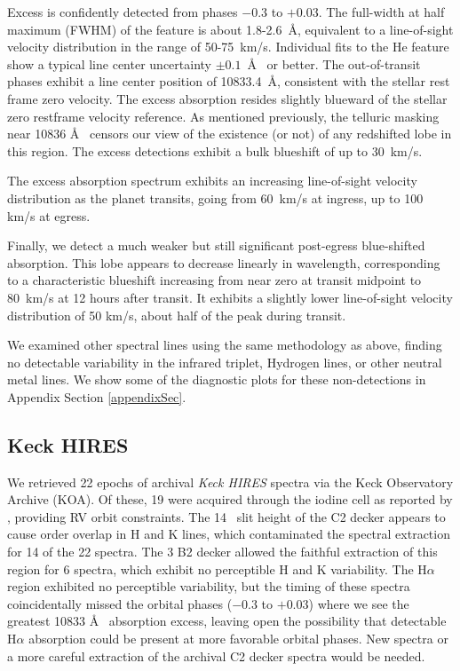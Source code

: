 \documentclass[twocolumn]{aastex631}
\begin{document}
Excess is confidently detected from phases $-$0.3 to $+$0.03.  The full-width at half maximum (FWHM) of the feature is about 1.8-2.6~\AA, equivalent to a line-of-sight velocity distribution in the range of 50-75~km/s.  Individual fits to the He feature show a typical line center uncertainty $\pm0.1$~\AA~ or better.  The out-of-transit phases exhibit a line center position of 10833.4~\AA, consistent with the stellar  rest frame zero velocity.  The excess absorption resides slightly blueward of the stellar zero restframe velocity reference.  As mentioned previously, the telluric masking near 10836 \AA~ censors our view of the existence (or not) of any redshifted lobe in this region.  The excess detections exhibit a bulk blueshift of up to 30~km/s.

The excess absorption spectrum exhibits an increasing line-of-sight velocity distribution as the planet transits, going from 60~km/s at ingress, up to 100 km/s at egress.

Finally, we detect a much weaker but still significant post-egress blue-shifted absorption.  This lobe appears to decrease linearly in wavelength, corresponding to a characteristic blueshift increasing from near zero at transit midpoint to 80~km/s at 12 hours after transit.  It exhibits a slightly lower line-of-sight velocity distribution of 50 km/s, about half of the peak during transit.

We examined other spectral lines using the same methodology as above, finding no detectable variability in the  infrared triplet, Hydrogen lines, or other neutral metal lines.  We show some of the diagnostic plots for these non-detections in Appendix Section \ref{appendixSec}.



\subsection{Keck HIRES}
We retrieved 22 epochs of archival \emph{Keck HIRES} spectra via the Keck Observatory Archive (KOA). Of these, 19 were acquired through the iodine cell as reported by \citet{2017AJ....153..211Z}, providing RV orbit constraints.  The 14\arcsec~ slit height of the C2 decker appears to cause order overlap in  H and K lines, which contaminated the spectral extraction for 14 of the 22 spectra.  The 3 B2 decker allowed the faithful extraction of this region for 6 spectra, which exhibit no perceptible  H and K variability.  The H$\alpha$ region exhibited no perceptible variability, but the timing of these spectra coincidentally missed the orbital phases ($-0.3$ to $+0.03$) where we see the greatest  10833 \AA~ absorption excess, leaving open the possibility that detectable H$\alpha$ absorption could be present at more favorable orbital phases.  New spectra or a more careful extraction of the archival C2 decker spectra would be needed.
\end{document}
